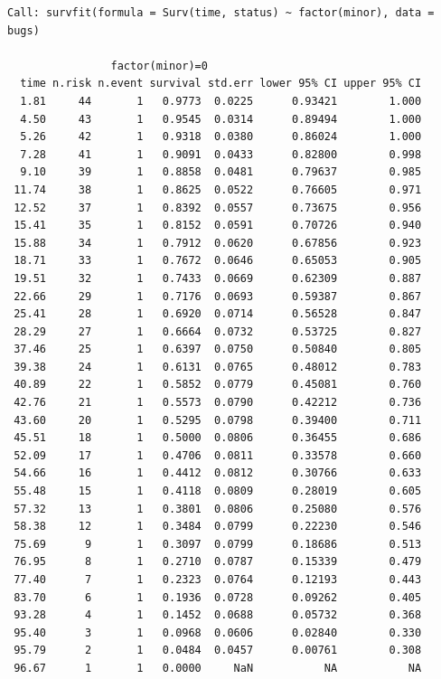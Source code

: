 \documentclass[11pt]{article}
\begin{document}
\begin{verbatim}
Call: survfit(formula = Surv(time, status) ~ factor(minor), data = bugs)

                factor(minor)=0 
  time n.risk n.event survival std.err lower 95% CI upper 95% CI
  1.81     44       1   0.9773  0.0225      0.93421        1.000
  4.50     43       1   0.9545  0.0314      0.89494        1.000
  5.26     42       1   0.9318  0.0380      0.86024        1.000
  7.28     41       1   0.9091  0.0433      0.82800        0.998
  9.10     39       1   0.8858  0.0481      0.79637        0.985
 11.74     38       1   0.8625  0.0522      0.76605        0.971
 12.52     37       1   0.8392  0.0557      0.73675        0.956
 15.41     35       1   0.8152  0.0591      0.70726        0.940
 15.88     34       1   0.7912  0.0620      0.67856        0.923
 18.71     33       1   0.7672  0.0646      0.65053        0.905
 19.51     32       1   0.7433  0.0669      0.62309        0.887
 22.66     29       1   0.7176  0.0693      0.59387        0.867
 25.41     28       1   0.6920  0.0714      0.56528        0.847
 28.29     27       1   0.6664  0.0732      0.53725        0.827
 37.46     25       1   0.6397  0.0750      0.50840        0.805
 39.38     24       1   0.6131  0.0765      0.48012        0.783
 40.89     22       1   0.5852  0.0779      0.45081        0.760
 42.76     21       1   0.5573  0.0790      0.42212        0.736
 43.60     20       1   0.5295  0.0798      0.39400        0.711
 45.51     18       1   0.5000  0.0806      0.36455        0.686
 52.09     17       1   0.4706  0.0811      0.33578        0.660
 54.66     16       1   0.4412  0.0812      0.30766        0.633
 55.48     15       1   0.4118  0.0809      0.28019        0.605
 57.32     13       1   0.3801  0.0806      0.25080        0.576
 58.38     12       1   0.3484  0.0799      0.22230        0.546
 75.69      9       1   0.3097  0.0799      0.18686        0.513
 76.95      8       1   0.2710  0.0787      0.15339        0.479
 77.40      7       1   0.2323  0.0764      0.12193        0.443
 83.70      6       1   0.1936  0.0728      0.09262        0.405
 93.28      4       1   0.1452  0.0688      0.05732        0.368
 95.40      3       1   0.0968  0.0606      0.02840        0.330
 95.79      2       1   0.0484  0.0457      0.00761        0.308
 96.67      1       1   0.0000     NaN           NA           NA


\end{verbatim}
\end{document}
